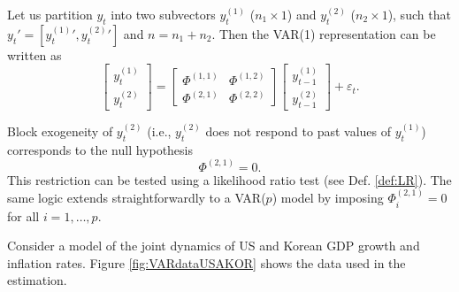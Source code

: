 \documentclass[
  11pt,
]{book}
\theoremstyle{definition}
\theoremstyle{definition}
\theoremstyle{definition}
\theoremstyle{definition}
\theoremstyle{remark}
\begin{document}
Let us partition \(y_t\) into two subvectors \(y^{(1)}_{t}\) (\(n_1 \times 1\)) and \(y^{(2)}_{t}\) (\(n_2 \times 1\)), such that \(y_t' = [{y^{(1)}_{t}}',{y^{(2)}_{t}}']\) and \(n = n_1 + n_2\). Then the VAR(1) representation can be written as
\[
\begin{bmatrix}
y^{(1)}_{t} \\
y^{(2)}_{t}
\end{bmatrix}
=
\begin{bmatrix}
\Phi^{(1,1)} & \Phi^{(1,2)} \\
\Phi^{(2,1)} & \Phi^{(2,2)}
\end{bmatrix}
\begin{bmatrix}
y^{(1)}_{t-1} \\
y^{(2)}_{t-1}
\end{bmatrix}
+
\varepsilon_t.
\]

Block exogeneity of \(y^{(2)}_t\) (i.e., \(y^{(2)}_t\) does not respond to past values of \(y^{(1)}_t\)) corresponds to the null hypothesis
\[
\Phi^{(2,1)} = 0.
\]
This restriction can be tested using a likelihood ratio test (see Def. \ref{def:LR}). The same logic extends straightforwardly to a VAR(\(p\)) model by imposing \(\Phi^{(2,1)}_i = 0\) for all \(i = 1,\dots,p\).

Consider a model of the joint dynamics of US and Korean GDP growth and inflation rates. Figure \ref{fig:VARdataUSAKOR} shows the data used in the estimation.
\end{document}
